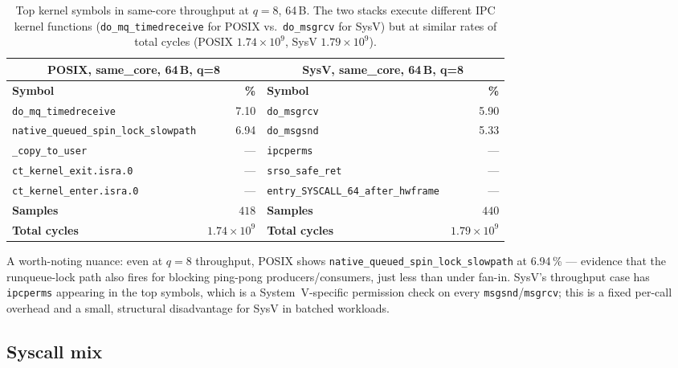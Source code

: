 \documentclass[a4paper,11pt]{article}
\begin{document}
\begin{table}[H]
\centering
\caption{Top kernel symbols in same-core throughput at $q=8$, 64\,B.
The two stacks execute different IPC kernel functions
(\texttt{do\_mq\_timedreceive} for POSIX vs.\ \texttt{do\_msgrcv} for
SysV) but at similar rates of total cycles
(POSIX $1.74\times 10^9$, SysV $1.79\times 10^9$).}
\label{tab:tp_hotfn_tp}
\footnotesize
\begin{tabular}{lrlr}
\toprule
\multicolumn{2}{c}{\textbf{POSIX, same\_core, 64\,B, q=8}}
& \multicolumn{2}{c}{\textbf{SysV, same\_core, 64\,B, q=8}} \\
\midrule
\textbf{Symbol} & \textbf{\%}
& \textbf{Symbol} & \textbf{\%} \\
\midrule
\texttt{do\_mq\_timedreceive}                  & 7.10 &
\texttt{do\_msgrcv}                            & 5.90 \\
\texttt{native\_queued\_spin\_lock\_slowpath}  & 6.94 &
\texttt{do\_msgsnd}                            & 5.33 \\
\texttt{\_copy\_to\_user}                      & --- &
\texttt{ipcperms}                              & --- \\
\texttt{ct\_kernel\_exit.isra.0}               & --- &
\texttt{srso\_safe\_ret}                       & --- \\
\texttt{ct\_kernel\_enter.isra.0}              & --- &
\texttt{entry\_SYSCALL\_64\_after\_hwframe}    & --- \\
\textbf{Samples} & $418$ &
\textbf{Samples} & $440$ \\
\textbf{Total cycles}        & $1.74\times 10^9$ &
\textbf{Total cycles}        & $1.79\times 10^9$ \\
\bottomrule
\end{tabular}
\end{table}

A worth-noting nuance: even at $q=8$ throughput, POSIX shows
\texttt{native\_queued\_spin\_lock\_slowpath} at 6.94\,\% --- evidence
that the runqueue-lock path also fires for blocking ping-pong
producers/consumers, just less than under fan-in. SysV's
throughput case has \texttt{ipcperms} appearing in the top symbols,
which is a System~V-specific permission check on every
\texttt{msgsnd}/\texttt{msgrcv}; this is a fixed per-call overhead
and a small, structural disadvantage for SysV in batched workloads.

\subsection{Syscall mix}
\label{sec:perf:strace}
\end{document}
